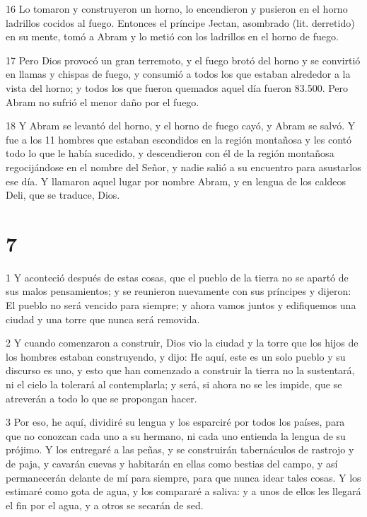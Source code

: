 \par 16 Lo tomaron y construyeron un horno, lo encendieron y pusieron en el horno ladrillos cocidos al fuego. Entonces el príncipe Jectan, asombrado (lit. derretido) en su mente, tomó a Abram y lo metió con los ladrillos en el horno de fuego.

\par 17 Pero Dios provocó un gran terremoto, y el fuego brotó del horno y se convirtió en llamas y chispas de fuego, y consumió a todos los que estaban alrededor a la vista del horno; y todos los que fueron quemados aquel día fueron 83.500. Pero Abram no sufrió el menor daño por el fuego.

\par 18 Y Abram se levantó del horno, y el horno de fuego cayó, y Abram se salvó. Y fue a los 11 hombres que estaban escondidos en la región montañosa y les contó todo lo que le había sucedido, y descendieron con él de la región montañosa regocijándose en el nombre del Señor, y nadie salió a su encuentro para asustarlos ese día. Y llamaron aquel lugar por nombre Abram, y en lengua de los caldeos Deli, que se traduce, Dios.



\chapter{7}

\par 1 Y aconteció después de estas cosas, que el pueblo de la tierra no se apartó de sus malos pensamientos; y se reunieron nuevamente con sus príncipes y dijeron: El pueblo no será vencido para siempre; y ahora vamos juntos y edifiquemos una ciudad y una torre que nunca será removida.

\par 2 Y cuando comenzaron a construir, Dios vio la ciudad y la torre que los hijos de los hombres estaban construyendo, y dijo: He aquí, este es un solo pueblo y su discurso es uno, y esto que han comenzado a construir la tierra no la sustentará, ni el cielo la tolerará al contemplarla; y será, si ahora no se les impide, que se atreverán a todo lo que se propongan hacer.

\par 3 Por eso, he aquí, dividiré su lengua y los esparciré por todos los países, para que no conozcan cada uno a su hermano, ni cada uno entienda la lengua de su prójimo. Y los entregaré a las peñas, y se construirán tabernáculos de rastrojo y de paja, y cavarán cuevas y habitarán en ellas como bestias del campo, y así permanecerán delante de mí para siempre, para que nunca idear tales cosas. Y los estimaré como gota de agua, y los compararé a saliva: y a unos de ellos les llegará el fin por el agua, y a otros se secarán de sed.

